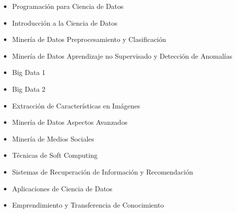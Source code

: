 

\begin{itemize}
\item Programación para Ciencia de Datos
\item Introducción a la Ciencia de Datos
\item Minería de Datos Preprocesamiento y Clasificación
\item Minería de Datos Aprendizaje no Supervisado y Detección de Anomalías
\item Big Data 1
\item Big Data 2
\item Extracción de Características en Imágenes
\item Minería de Datos Aspectos Avanzados
\item Minería de Medios Sociales
\item Técnicas de Soft Computing
\item Sistemas de Recuperación de Información y Recomendación
\item Aplicaciones de Ciencia de Datos
\item Emprendimiento y Transferencia de Conocimiento
\end{itemize}


\divider





 












\clearpage
